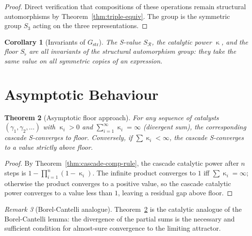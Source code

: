 \documentclass[twocolumn,11pt,a4paper]{article}
\theoremstyle{thmstyle}
\newtheorem{theorem}{Theorem}[section]
\newtheorem{corollary}[theorem]{Corollary}
\theoremstyle{thmstyle}
\theoremstyle{definition}
\theoremstyle{remark}
\newtheorem{remark}[theorem]{Remark}
\DeclareMathOperator{\catpow}{\kappa}
\newcommand{\receiver}{\mathcal{R}}
\newcommand{\Sscalar}{S}
\newcommand{\Sfloor}{S_{\flat}}
\begin{document}
\begin{proof}
Direct verification that compositions of these
operations remain structural automorphisms by
Theorem~\ref{thm:triple-equiv}.  The group is the
symmetric group $S_{3}$ acting on the three
representations.
\end{proof}

\begin{corollary}[Invariants of $G_{\mathrm{str}}$]
\label{cor:invariants}
The S-value $\Sscalar_{\receiver}$, the catalytic
power $\catpow$, and the floor $\Sfloor$ are all
invariants of the structural automorphism group:
they take the same value on all symmetric copies
of an expression.
\end{corollary}

\section{Asymptotic Behaviour}
\label{sec:asymptotic-behaviour}

\begin{theorem}[Asymptotic floor approach]
\label{thm:asymp-floor}
For any sequence of catalysts
$(\gamma_{1}, \gamma_{2}, \ldots)$ with
$\catpow_{i} > 0$ and
$\sum_{i=1}^{\infty} \catpow_{i} = \infty$
(divergent sum), the corresponding cascade
S-converges to floor.  Conversely, if
$\sum \catpow_{i} < \infty$, the cascade
S-converges to a value strictly above floor.
\end{theorem}

\begin{proof}
By Theorem~\ref{thm:cascade-comp-rule}, the
cascade catalytic power after $n$ steps is
$1 - \prod_{i=1}^{n} (1 - \catpow_{i})$.  The
infinite product converges to $1$ iff
$\sum \catpow_{i} = \infty$; otherwise the
product converges to a positive value, so the
cascade catalytic power converges to a value less
than $1$, leaving a residual gap above floor.
\end{proof}

\begin{remark}[Borel-Cantelli analogue]
\label{rem:borel-cantelli}
Theorem~\ref{thm:asymp-floor} is the catalytic
analogue of the Borel-Cantelli lemma: the
divergence of the partial sums is the necessary
and sufficient condition for almost-sure
convergence to the limiting attractor.
\end{remark}
\end{document}
